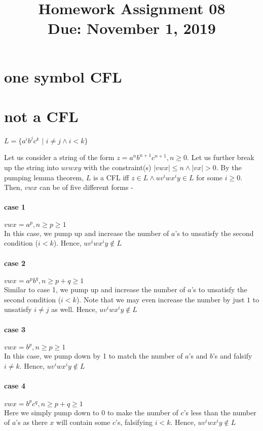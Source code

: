 \documentclass[11pt,letterpaper]{article}
\title{Homework Assignment 08 \\
    \small Due: November 1, 2019}
\begin{document}
\maketitle

\section{one symbol CFL}


\section{not a CFL}
\begin{center}
    $L = \{a^i b^j c^k$ $|$ $i \neq j \wedge i<k\}$
\end{center}
Let us consider a string of the form $z = a^n b^{n+1} c^{n+1}, n \geq 0$. Let us further break up the string into $uvwxy$ with the constraint(s) $|vwx| \leq n \wedge |vx| > 0$. By the pumping lemma theorem, $L$ is a CFL iff $z \in L \wedge uv^iwx^iy \in L$ for some $i \geq 0$. Then, $vwx$ can be of five different forms -
\paragraph{case 1} $vwx = a^p, n \geq p \geq 1$ \\
In this case, we pump up and increase the number of $a$'s to unsatisfy the second condition ($i<k$). Hence, $uv^iwx^iy \notin L$
\paragraph{case 2} $vwx = a^pb^q, n \geq p+q \geq 1$ \\
Similar to case 1, we pump up and increase the number of $a$'s to unsatisfy the second condition ($i<k$). Note that we may even increase the number by just $1$ to unsatisfy $i \neq j$ as well. Hence, $uv^iwx^iy \notin L$
\paragraph{case 3} $vwx = b^p, n \geq p \geq 1$ \\
In this case, we pump down by 1 to match the number of $a$'s and $b$'s and falsify $i \neq k$. Hence, $uv^iwx^iy \notin L$
\paragraph{case 4} $vwx = b^pc^q, n \geq p+q \geq 1$ \\
Here we simply pump down to $0$ to make the number of $c$'s less than the number of $a$'s as there $x$ will contain some $c$'s, falsifying $i < k$. Hence, $uv^iwx^iy \notin L$
\end{document}
